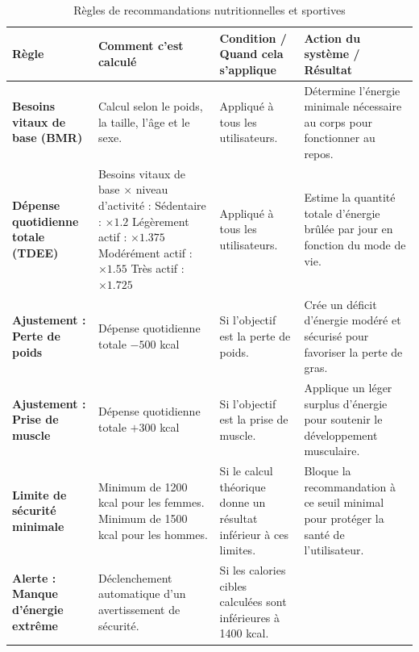\documentclass[a4paper,12pt]{report}
\begin{document}
\begin{table}[H]
\sloppy
\centering
\caption{Règles de recommandations nutritionnelles et sportives}
\label{tab:regles_calcul_energetique_recommandations}
\scriptsize
\renewcommand{\arraystretch}{1.25}
\setlength{\tabcolsep}{3pt}
\begin{tabularx}{\textwidth}{|>{\RaggedRight\arraybackslash}p{2.8cm}|>{\RaggedRight\arraybackslash}p{4.1cm}|>{\RaggedRight\arraybackslash}p{3.2cm}|>{\RaggedRight\arraybackslash}X|}
\hline
\textbf{Règle} & \textbf{Comment c'est calculé} & \textbf{Condition / Quand cela s'applique} & \textbf{Action du système / Résultat} \\
\hline
\textbf{Besoins vitaux de base (BMR)} &
Calcul selon le poids, la taille, l'âge et le sexe. &
Appliqué à tous les utilisateurs. &
Détermine l'énergie minimale nécessaire au corps pour fonctionner au repos. \\
\hline
\textbf{Dépense quotidienne totale (TDEE)} &
Besoins vitaux de base $\times$ niveau d'activité :\newline
\textbullet{} Sédentaire : $\times 1.2$\newline
\textbullet{} Légèrement actif : $\times 1.375$\newline
\textbullet{} Modérément actif : $\times 1.55$\newline
\textbullet{} Très actif : $\times 1.725$ &
Appliqué à tous les utilisateurs. &
Estime la quantité totale d'énergie brûlée par jour en fonction du mode de vie. \\
\hline
\textbf{Ajustement : Perte de poids} &
Dépense quotidienne totale $- 500$ kcal &
Si l'objectif est la perte de poids. &
Crée un déficit d'énergie modéré et sécurisé pour favoriser la perte de gras. \\
\hline
\textbf{Ajustement : Prise de muscle} &
Dépense quotidienne totale $+ 300$ kcal &
Si l'objectif est la prise de muscle. &
Applique un léger surplus d'énergie pour soutenir le développement musculaire. \\
\hline
\textbf{Limite de sécurité minimale} &
Minimum de 1200 kcal pour les femmes.\newline
Minimum de 1500 kcal pour les hommes. &
Si le calcul théorique donne un résultat inférieur à ces limites. &
Bloque la recommandation à ce seuil minimal pour protéger la santé de l'utilisateur. \\
\hline
\textbf{Alerte : Manque d'énergie extrême} &
Déclenchement automatique d'un avertissement de sécurité. &
Si les calories cibles calculées sont inférieures à 1400 kcal. &

\end{tabularx}
\end{table}
\end{document}
